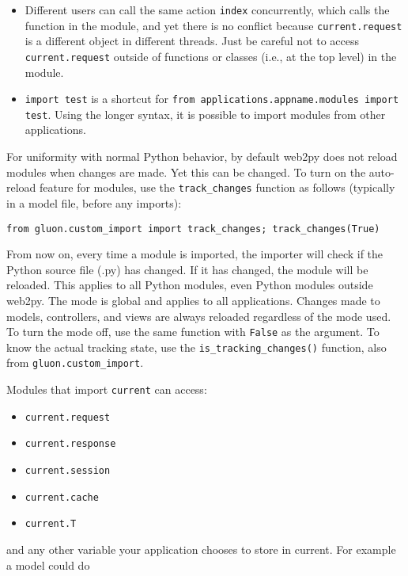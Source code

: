 \documentclass[justified,sixbynine,notoc]{tufte-book}
\def\ft{\small\tt}
\begin{document}
\begin{fullwidth}
\begin{itemize}
\item Different users can call the same action {\ft index} concurrently, which calls the function in the module, and yet there is no conflict because {\ft current.request} is a different object in different threads. Just be careful not to access {\ft current.request} outside of functions or classes (i.e., at the top level) in the module.

\item {\ft import test} is a shortcut for {\ft from applications.appname.modules import test}. Using the longer syntax, it is possible to import modules from other applications.
\end{itemize}

For uniformity with normal Python behavior, by default web2py does not reload modules when changes are made. Yet this can be changed. To turn on the auto-reload feature for modules, use the {\ft track\_changes} function as follows (typically in a model file, before any imports):

\begin{lstlisting}
from gluon.custom_import import track_changes; track_changes(True)
\end{lstlisting}

From now on, every time a module is imported, the importer will check if the Python source file (.py) has changed. If it has changed, the module will be reloaded. This applies to all Python modules, even Python modules outside web2py. The mode is global and applies to all applications. Changes made to models, controllers, and views are always reloaded regardless of the mode used. To turn the mode off, use the same function with {\ft False} as the argument. To know the actual tracking state, use the {\ft is\_tracking\_changes()} function, also from {\ft gluon.custom\_import}.

Modules that import {\ft current} can access:
\begin{itemize}
\item {\ft current.request}

\item {\ft current.response}

\item {\ft current.session}

\item {\ft current.cache}

\item {\ft current.T}
\end{itemize}
and any other variable your application chooses to store in current. For example a model could do


\end{fullwidth}
\end{document}
